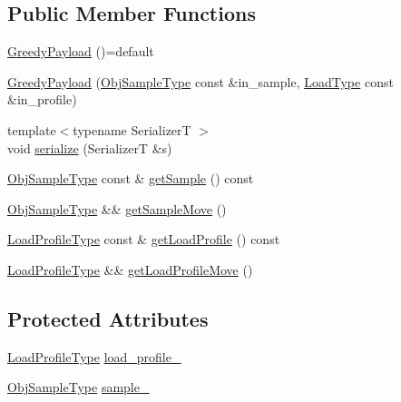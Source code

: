 \subsection*{Public Member Functions}
\begin{DoxyCompactItemize}
\item 
\hyperlink{structvt_1_1vrt_1_1collection_1_1lb_1_1_greedy_payload_ad4da82c6ba27244f3258f8a4e76871f8}{Greedy\+Payload} ()=default
\item 
\hyperlink{structvt_1_1vrt_1_1collection_1_1lb_1_1_greedy_payload_a7de799b4cb1eb3681b3a7aba4b60f8d0}{Greedy\+Payload} (\hyperlink{structvt_1_1vrt_1_1collection_1_1lb_1_1_greedy_l_b_types_a467f8a79d0785fca5fc95bd5c0f406b9}{Obj\+Sample\+Type} const \&in\+\_\+sample, \hyperlink{namespacevt_a8fb51741340b87d7aaee0bef60e9896b}{Load\+Type} const \&in\+\_\+profile)
\item 
{\footnotesize template$<$typename SerializerT $>$ }\\void \hyperlink{structvt_1_1vrt_1_1collection_1_1lb_1_1_greedy_payload_a7b28a57071b54698609dd94da9cf9c0e}{serialize} (SerializerT \&s)
\item 
\hyperlink{structvt_1_1vrt_1_1collection_1_1lb_1_1_greedy_l_b_types_a467f8a79d0785fca5fc95bd5c0f406b9}{Obj\+Sample\+Type} const  \& \hyperlink{structvt_1_1vrt_1_1collection_1_1lb_1_1_greedy_payload_aeb49fabc4eb3b15bf698309c651abafe}{get\+Sample} () const
\item 
\hyperlink{structvt_1_1vrt_1_1collection_1_1lb_1_1_greedy_l_b_types_a467f8a79d0785fca5fc95bd5c0f406b9}{Obj\+Sample\+Type} \&\& \hyperlink{structvt_1_1vrt_1_1collection_1_1lb_1_1_greedy_payload_a294dcb18ec60ae644f5a5112bbd2987a}{get\+Sample\+Move} ()
\item 
\hyperlink{structvt_1_1vrt_1_1collection_1_1lb_1_1_greedy_l_b_types_a8af324cd88e83727178631e4d1478932}{Load\+Profile\+Type} const  \& \hyperlink{structvt_1_1vrt_1_1collection_1_1lb_1_1_greedy_payload_a9c4cc1760d2a176ea190cd055b121ec2}{get\+Load\+Profile} () const
\item 
\hyperlink{structvt_1_1vrt_1_1collection_1_1lb_1_1_greedy_l_b_types_a8af324cd88e83727178631e4d1478932}{Load\+Profile\+Type} \&\& \hyperlink{structvt_1_1vrt_1_1collection_1_1lb_1_1_greedy_payload_a2f16402fb9c14fb36a378985919b35f0}{get\+Load\+Profile\+Move} ()
\end{DoxyCompactItemize}
\subsection*{Protected Attributes}
\begin{DoxyCompactItemize}
\item 
\hyperlink{structvt_1_1vrt_1_1collection_1_1lb_1_1_greedy_l_b_types_a8af324cd88e83727178631e4d1478932}{Load\+Profile\+Type} \hyperlink{structvt_1_1vrt_1_1collection_1_1lb_1_1_greedy_payload_afb95c0d993a5e23a1b66d7c411d5a415}{load\+\_\+profile\+\_\+}
\item 
\hyperlink{structvt_1_1vrt_1_1collection_1_1lb_1_1_greedy_l_b_types_a467f8a79d0785fca5fc95bd5c0f406b9}{Obj\+Sample\+Type} \hyperlink{structvt_1_1vrt_1_1collection_1_1lb_1_1_greedy_payload_a06b7ae7ccf00d3d7afcf7398e632ca9c}{sample\+\_\+}
\end{DoxyCompactItemize}
